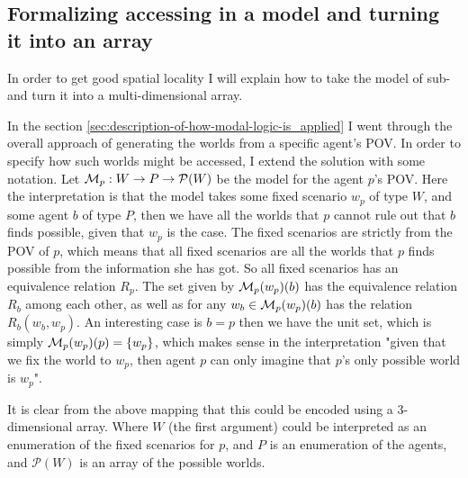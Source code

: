 \subsection{Formalizing accessing in a model and turning it into an array} \label{sec:model-access}
In order to get good spatial locality I will explain how to take the model of sub-\SfiveN{} and turn it into a multi-dimensional array.

In the section \ref{sec:description-of-how-modal-logic-is_applied} I went through the overall approach of generating the worlds from a specific agent's POV. 
In order to specify how such worlds might be accessed, I extend the solution with some notation. 
Let $\mathcal{M}_p: W \rightarrow P \rightarrow \mathcal{P}(W)$ be the model for the agent $p$'s POV. 
Here the interpretation is that the model takes some fixed scenario $w_p$ of type $W$, and some agent $b$ of type $P$, then we have all the worlds that $p$ cannot rule out that $b$ finds possible, given that $w_p$ is the case.  
The fixed scenarios are strictly from the POV of $p$, which means that all fixed scenarios are all the worlds that $p$ finds possible from the information she has got. 
So all fixed scenarios has an equivalence relation $R_p$. 
The set given by $\mathcal{M}_p(w_p)(b)$ has the equivalence relation $R_b$ among each other, as well as for any $w_b \in \mathcal{M}_p(w_p)(b)$ has the relation $R_b(w_b,w_p)$.
An interesting case is $b=p$ then we have the unit set, which is simply $\mathcal{M}_p(w_p)(p) = \{w_p\}$,
which makes sense in the interpretation "given that we fix the world to $w_p$, then agent $p$ can only imagine that $p$'s only possible world is $w_p$". 

It is clear from the above mapping that this could be encoded using a 3-dimensional array. 
Where $W$ (the first argument) could be interpreted as an enumeration of the fixed scenarios for $p$, and $P$ is an enumeration of the agents, and $\mathcal{P}(W)$ is an array of the possible worlds.


